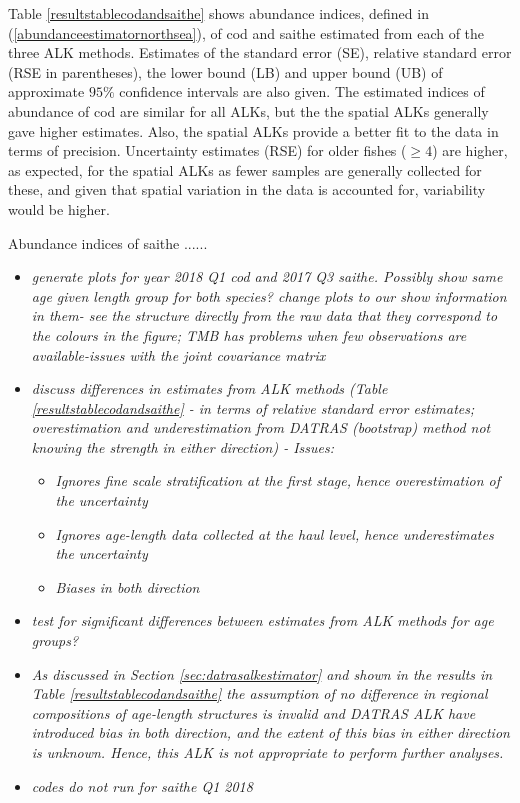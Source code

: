 \documentclass[a4paper 12pt]{article}
\numberwithin{equation}{section}
\begin{document}
Table \ref{resultstablecodandsaithe} shows abundance indices, defined in (\ref{abundanceestimatornorthsea}), of cod and saithe estimated from each of the three ALK methods. Estimates of the standard error (SE), relative standard error (RSE in parentheses), the lower bound (LB) and upper bound (UB) of approximate $95 \%$ confidence intervals are also given. The estimated indices of abundance of cod are similar for all ALKs, but the the spatial ALKs generally gave higher estimates. Also, the spatial ALKs provide a better fit to the data in terms of precision. Uncertainty estimates (RSE) for older fishes ($\ge 4$) are higher, as expected, for the spatial ALKs as fewer samples are generally collected for these, and given that spatial variation in the data is accounted for, variability would be higher.

Abundance indices of saithe ......


\begin{itemize}
\item \emph{generate plots for year 2018 Q1 cod and 2017 Q3 saithe. Possibly show same age given length group for both species? change plots to our show information in them- see the structure directly from the raw data that they correspond to the colours in the figure; TMB has problems when few observations are available-issues with the joint covariance matrix }
\item \emph{discuss differences in estimates from ALK methods (Table \ref{resultstablecodandsaithe} - in terms of relative standard error estimates; overestimation and underestimation from DATRAS (bootstrap) method not knowing the strength in either direction) - Issues:}
\begin{itemize}
\item \emph{Ignores fine scale stratification at the first stage, hence overestimation of the uncertainty}
\item \emph{Ignores age-length data collected at the haul level, hence underestimates the uncertainty}
\item \emph{Biases in both direction}
\end{itemize}
\item \emph{test for significant differences between estimates from ALK methods for age groups?}
\item \emph{As discussed in Section \ref{sec:datrasalkestimator} and shown in the results in Table \ref{resultstablecodandsaithe} the assumption of no difference in regional compositions of age-length structures is invalid and DATRAS ALK have introduced bias in both direction, and the extent of this  bias in either direction is unknown. Hence, this ALK is not appropriate to perform further analyses. }
\item \emph{codes do not run for saithe Q1 2018}
\end{itemize}
\end{document}
